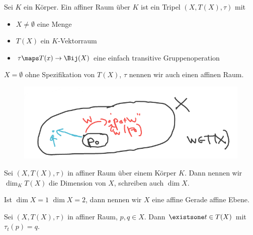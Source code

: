 \begin{definition*}
    Sei \( K \) ein Körper. 
    Ein affiner Raum über \( K \) ist ein Tripel \( (X, T(X), \tau ) \) mit
    \begin{itemize}
        \item \( X\neq \emptyset \) eine Menge 
        \item \( T(X) \) ein \( K \)-Vektorraum 
        \item \( \tau\maps T(x)\to \Bij(X) \) eine einfach transitive Gruppenoperation
    \end{itemize}
\end{definition*}
\begin{konvention*}
    \( X=\emptyset \) ohne Spezifikation von \( T(X) \), \( \tau \) nennen wir auch einen affinen Raum.
\end{konvention*}
\begin{figure}[H]
    \centering
    \includegraphics[width=0.5\linewidth]{figures/affiner_raum}
    \label{fig:affiner_raum}
\end{figure}
\begin{definition*}
    Sei \( (X,T(X),\tau) \) in affiner Raum über einem Körper \( K \). 
    Dann nennen wir \( \dim_K T(X) \) die Dimension von \( X \), schreiben auch \( \dim X \).
     
    Ist \( \dim X=1 \) \bzw \( \dim X=2 \), dann nennen wir \( X \) eine affine Gerade \bzw affine Ebene.
\end{definition*}

Sei \( (X, T(X), \tau) \) in affiner Raum, \( p,q\in X \). Dann \( \existsone t\in T(X) \) mit \( \tau_t(p)=q \).

